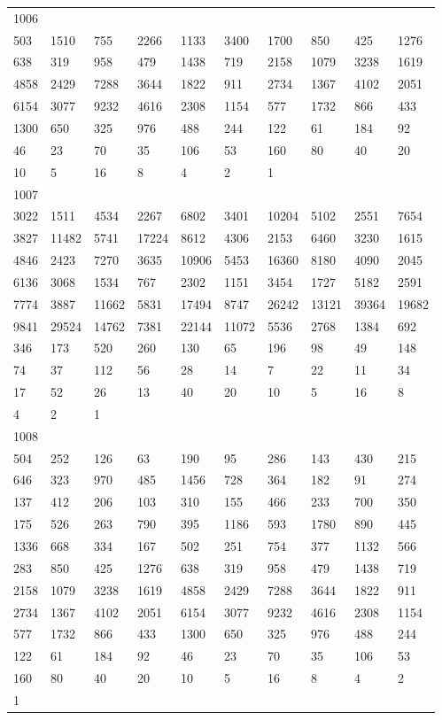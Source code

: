 \begin{longtable}{*{10}{l}}
1006&&&&&&&&&\\
503& 1510& 755& 2266& 1133& 3400& 1700& 850& 425& 1276\\
638& 319& 958& 479& 1438& 719& 2158& 1079& 3238& 1619\\
4858& 2429& 7288& 3644& 1822& 911& 2734& 1367& 4102& 2051\\
6154& 3077& 9232& 4616& 2308& 1154& 577& 1732& 866& 433\\
1300& 650& 325& 976& 488& 244& 122& 61& 184& 92\\
46& 23& 70& 35& 106& 53& 160& 80& 40& 20\\
10& 5& 16& 8& 4& 2& 1& \\

1007&&&&&&&&&\\
3022& 1511& 4534& 2267& 6802& 3401& 10204& 5102& 2551& 7654\\
3827& 11482& 5741& 17224& 8612& 4306& 2153& 6460& 3230& 1615\\
4846& 2423& 7270& 3635& 10906& 5453& 16360& 8180& 4090& 2045\\
6136& 3068& 1534& 767& 2302& 1151& 3454& 1727& 5182& 2591\\
7774& 3887& 11662& 5831& 17494& 8747& 26242& 13121& 39364& 19682\\
9841& 29524& 14762& 7381& 22144& 11072& 5536& 2768& 1384& 692\\
346& 173& 520& 260& 130& 65& 196& 98& 49& 148\\
74& 37& 112& 56& 28& 14& 7& 22& 11& 34\\
17& 52& 26& 13& 40& 20& 10& 5& 16& 8\\
4& 2& 1& \\

1008&&&&&&&&&\\
504& 252& 126& 63& 190& 95& 286& 143& 430& 215\\
646& 323& 970& 485& 1456& 728& 364& 182& 91& 274\\
137& 412& 206& 103& 310& 155& 466& 233& 700& 350\\
175& 526& 263& 790& 395& 1186& 593& 1780& 890& 445\\
1336& 668& 334& 167& 502& 251& 754& 377& 1132& 566\\
283& 850& 425& 1276& 638& 319& 958& 479& 1438& 719\\
2158& 1079& 3238& 1619& 4858& 2429& 7288& 3644& 1822& 911\\
2734& 1367& 4102& 2051& 6154& 3077& 9232& 4616& 2308& 1154\\
577& 1732& 866& 433& 1300& 650& 325& 976& 488& 244\\
122& 61& 184& 92& 46& 23& 70& 35& 106& 53\\
160& 80& 40& 20& 10& 5& 16& 8& 4& 2\\
1& \\


\end{longtable}
